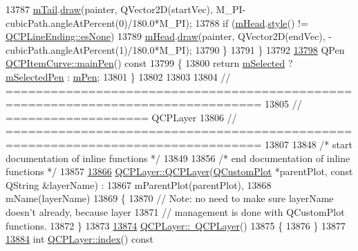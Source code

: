 \begin{DoxyCode}
13787       \hyperlink{a00034_af1dca285b97e3f5b892dab827a79f327}{mTail}.\hyperlink{a00046_ac4b2fa94bd27b2f008b5fc090fcd7c0b}{draw}(painter, QVector2D(startVec), M\_PI-cubicPath.angleAtPercent(0)/180.0*M\_PI);
13788     \textcolor{keywordflow}{if} (\hyperlink{a00034_af2cc26ff199570940dc96f5ec19a13f8}{mHead}.\hyperlink{a00046_aea324dbfddbca9895ca8a3a968671299}{style}() != \hyperlink{a00046_a5ef16e6876b4b74959c7261d8d4c2cd5aca12d500f50cd6871766801bac30fb03}{QCPLineEnding::esNone})
13789       \hyperlink{a00034_af2cc26ff199570940dc96f5ec19a13f8}{mHead}.\hyperlink{a00046_ac4b2fa94bd27b2f008b5fc090fcd7c0b}{draw}(painter, QVector2D(endVec), -cubicPath.angleAtPercent(1)/180.0*M\_PI);
13790   \}
13791 \}
13792 
\hypertarget{a00115_source_l13798}{}\hyperlink{a00034_a8089126f5645b6edfbaddea49d1e8390}{13798} QPen \hyperlink{a00034_a8089126f5645b6edfbaddea49d1e8390}{QCPItemCurve::mainPen}()\textcolor{keyword}{ const}
13799 \textcolor{keyword}{}\{
13800   \textcolor{keywordflow}{return} \hyperlink{a00022_a4bdb3457dad1d268c0f78a44152b9645}{mSelected} ? \hyperlink{a00034_ab22cbab261b20be5aa8e4ca252149246}{mSelectedPen} : \hyperlink{a00034_a7ef92988d1db2e4d0311e34c0a57fe42}{mPen};
13801 \}
13802 
13803 
13804 \textcolor{comment}{// ================================================================================}
13805 \textcolor{comment}{// =================== QCPLayer}
13806 \textcolor{comment}{// ================================================================================}
13807 
13848 \textcolor{comment}{/* start documentation of inline functions */}
13849 
13856 \textcolor{comment}{/* end documentation of inline functions */}
13857 
\hypertarget{a00115_source_l13866}{}\hyperlink{a00043_a5d0657fc86d624e5efbe930ef21af718}{13866} \hyperlink{a00043_a5d0657fc86d624e5efbe930ef21af718}{QCPLayer::QCPLayer}(\hyperlink{a00030_d8/d00/a00186}{QCustomPlot} *parentPlot, \textcolor{keyword}{const} QString &layerName) :
13867   mParentPlot(parentPlot),
13868   mName(layerName)
13869 \{
13870   \textcolor{comment}{// Note: no need to make sure layerName doesn't already, because layer}
13871   \textcolor{comment}{// management is done with QCustomPlot functions.}
13872 \}
13873 
\hypertarget{a00115_source_l13874}{}\hyperlink{a00043_afc1a8940f8e34c9f25ead9dfd4828cae}{13874} \hyperlink{a00043_afc1a8940f8e34c9f25ead9dfd4828cae}{QCPLayer::~QCPLayer}()
13875 \{
13876 \}
13877 
\hypertarget{a00115_source_l13884}{}\hyperlink{a00043_ad5d7010829a6b99f326b07d7e37c8c99}{13884} \textcolor{keywordtype}{int} \hyperlink{a00043_ad5d7010829a6b99f326b07d7e37c8c99}{QCPLayer::index}()\textcolor{keyword}{ const}

\end{DoxyCode}
